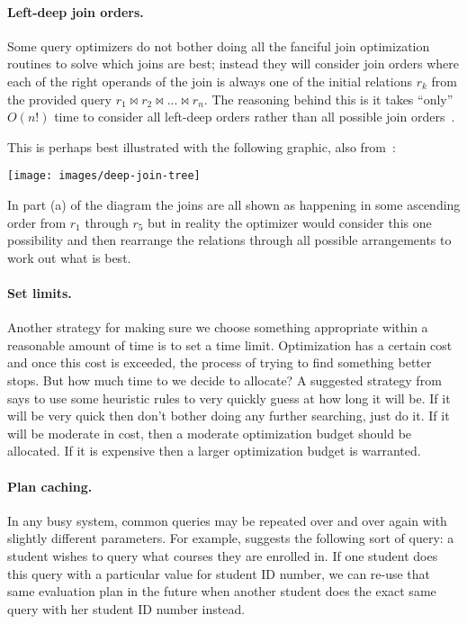 \documentclass[a4paper]{report}
\begin{document}
\paragraph{Left-deep join orders.} Some query optimizers do not bother doing all the fanciful join optimization routines to solve which joins are best; instead they will consider join orders where each of the right operands of the join is always one of the initial relations $r_{k}$ from the provided query $r_{1} \bowtie r_{2} \bowtie ... \bowtie r_{n}$. The reasoning behind this is it takes ``only'' $O(n!)$ time to consider all left-deep orders rather than all possible join orders~\cite{dsc}. 

This is perhaps best illustrated with the following graphic, also from~\cite{dsc}:

\begin{center}
	\texttt{[image: images/deep-join-tree]}
\end{center}

In part (a) of the diagram the joins are all shown as happening in some ascending order  from $r_{1}$ through $r_{5}$ but in reality the optimizer would consider this one possibility and then rearrange the relations through all possible arrangements to work out what is best.

\paragraph{Set limits.} Another strategy for making sure we choose something appropriate within a reasonable amount of time is to set a time limit. Optimization has a certain cost and once this cost is exceeded, the process of trying to find something better stops. But how much time to we decide to allocate? A suggested strategy from~\cite{dsc} says to use some heuristic rules to very quickly guess at how long it will be. If it will be very quick then don't bother doing any further searching, just do it. If it will be moderate in cost, then a moderate optimization budget should be allocated. If it is expensive then a larger optimization budget is warranted.

\paragraph{Plan caching.} In any busy system, common queries may be repeated over and over again with slightly different parameters. For example, \cite{dsc} suggests the following sort of query: a student wishes to query what courses they are enrolled in. If one student does this query with a particular value for student ID number, we can re-use that same evaluation plan in the future when another student does the exact same query with her student ID number instead. 
\end{document}
